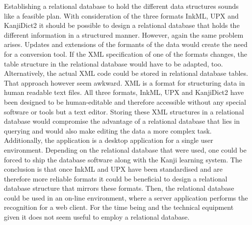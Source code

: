 Establishing a relational database to hold the different data structures 
sounds like a feasible plan. With consideration of the three formats
InkML, UPX and KanjiDict2 it should be possible to design a relational database
that holds the different information in a structured manner.
However, again the same problem arises. Updates and extensions of the formants
of the data would create the need for a conversion tool.
If the XML specification of one of the formats changes, the table structure
in the relational database would have to be adapted, too.
Alternatively, the actual XML code could be stored in relational database 
tables. That approach however seem awkward. XML is a format for structuring
data in human readable text files. All three formats, InkML, UPX and KanjiDict2
have been designed to be human-editable and therefore accessible without
any special software or tools but a text editor.
Storing these XML structures in a relational database would compromise the 
advantage of a relational database that lies in querying and would also
make editing the data a more complex task.
Additionally, the application is a desktop application for a single user 
environment. Depending on the relational database that were used,
one could be forced to ship the database software along with the Kanji 
learning system.
The conclusion is that once InkML and UPX have been standardised and are
therefore more reliable formats it could be beneficial to design a relational
database structure that mirrors these formats.
Then, the relational database could be used in an on-line environment, 
where a server application performs the recognition for a web client.
For the time being and the technical equipment given it does not seem
useful to employ a relational database.




